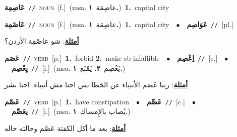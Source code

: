 \documentclass[10pt,a4paper,twoside]{article} %
\begin{document}
\begin{multicols}{2}
{\setlength\topsep{0pt}\textbf{\foreignlanguage{arabic}{عَاصِمِة}}\ {\color{gray}\texttt{//}\color{black}}\ \textsc{noun}\ [f.]\ \color{gray}(msa. \foreignlanguage{arabic}{عاصِمَة}~\foreignlanguage{arabic}{\textbf{١.}})\color{black}\ \textbf{1.}~capital city\ } \vspace{2mm}

{\setlength\topsep{0pt}\textbf{\foreignlanguage{arabic}{عَاصْمِة}}\ {\color{gray}\texttt{//}\color{black}}\ \textsc{noun}\ [f.]\ \color{gray}(msa. \foreignlanguage{arabic}{عاصِمَة}~\foreignlanguage{arabic}{\textbf{١.}})\color{black}\ \textbf{1.}~capital city\ \ $\bullet$\ \ \setlength\topsep{0pt}\textbf{\foreignlanguage{arabic}{عَوَاصِم}}\ {\color{gray}\texttt{//}\color{black}}\ [pl.]\  \begin{flushright}\color{gray}\foreignlanguage{arabic}{\textbf{\underline{\foreignlanguage{arabic}{أمثلة}}}: شو عاصْمِة الأردن؟}\end{flushright}\color{black}} \vspace{2mm}

{\setlength\topsep{0pt}\textbf{\foreignlanguage{arabic}{عَصَم}}\ {\color{gray}\texttt{//}\color{black}}\ \textsc{verb}\ [p.]\ \textbf{1.}~forbid  \textbf{2.}~make sb infallible\ \ $\bullet$\ \ \setlength\topsep{0pt}\textbf{\foreignlanguage{arabic}{اِعْصِم}}\ {\color{gray}\texttt{//}\color{black}}\ [c.]\ \ $\bullet$\ \ \setlength\topsep{0pt}\textbf{\foreignlanguage{arabic}{يِعْصِم}}\ {\color{gray}\texttt{//}\color{black}}\ [i.]\ \color{gray}(msa. \foreignlanguage{arabic}{يَعْصِم}~\foreignlanguage{arabic}{\textbf{٢.}}  \foreignlanguage{arabic}{يَمْنَع}~\foreignlanguage{arabic}{\textbf{١.}})\color{black}\  \begin{flushright}\color{gray}\foreignlanguage{arabic}{\textbf{\underline{\foreignlanguage{arabic}{أمثلة}}}: ربنا عَصَم الأنبياء عن الخطأ بس احنا مش أنبياء. احنا بشر}\end{flushright}\color{black}} \vspace{2mm}

{\setlength\topsep{0pt}\textbf{\foreignlanguage{arabic}{عَصَّم}}\ {\color{gray}\texttt{//}\color{black}}\ \textsc{verb}\ [p.]\ \textbf{1.}~have constipation\ \ $\bullet$\ \ \setlength\topsep{0pt}\textbf{\foreignlanguage{arabic}{عَصِّم}}\ {\color{gray}\texttt{//}\color{black}}\ [c.]\ \ $\bullet$\ \ \setlength\topsep{0pt}\textbf{\foreignlanguage{arabic}{يعَصِّم}}\ {\color{gray}\texttt{//}\color{black}}\ [i.]\ \color{gray}(msa. \foreignlanguage{arabic}{يُصاب بالإِمساك}~\foreignlanguage{arabic}{\textbf{١.}})\color{black}\  \begin{flushright}\color{gray}\foreignlanguage{arabic}{\textbf{\underline{\foreignlanguage{arabic}{أمثلة}}}: بعد ما أكل الكفتة عَصَّم وحالته حاله}\end{flushright}\color{black}} \vspace{2mm}


\end{multicols}
\end{document}
